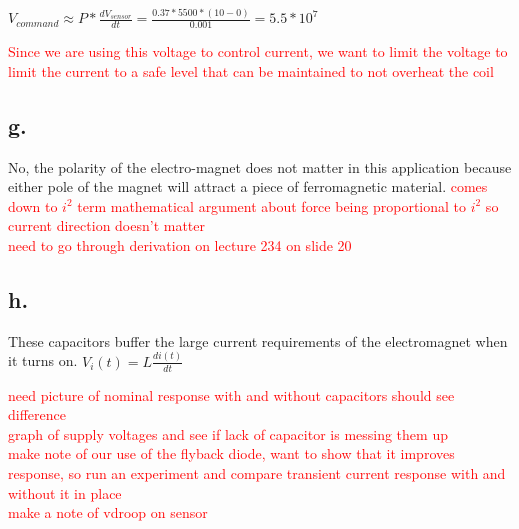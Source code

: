 \documentclass{article}
\newcommand{\xxx}[1]{\textcolor{red}{#1}}
\theoremstyle{plain}
\theoremstyle{definition}
\theoremstyle{remark}
\begin{document}
\begin{center}
$V_{command} \approx P * \frac{dV_{sensor}}{dt}  = \frac{0.37 * 5500 * (10 - 0)}{0.001} = 5.5*10^7$
\end{center}

\xxx{Since we are using this voltage to control current, we want to limit the voltage to limit the current to a safe level that can be maintained to not overheat the coil}

\subsection*{g.}
No, the polarity of the electro-magnet does not matter in this application because either pole of the magnet will attract a piece of ferromagnetic material. \xxx{comes down to $i^2$ term}
\xxx{mathematical argument about force being proportional to $i^2$ so current direction doesn't matter} \\
\xxx{need to go through derivation on lecture 234 on slide 20}

\subsection*{h.}
These capacitors buffer the large current requirements of the electromagnet when it turns on. 
$V_i(t) = L\frac{di(t)}{dt}$

\xxx{need picture of nominal response with and without capacitors should see difference}\\
\xxx{graph of supply voltages and see if lack of capacitor is messing them up}\\

\xxx{make note of our use of the flyback diode, want to show that it improves response, so run an experiment and compare transient current response with and without it in place} \\

\xxx{make a note of vdroop on sensor} \\
\end{document}
